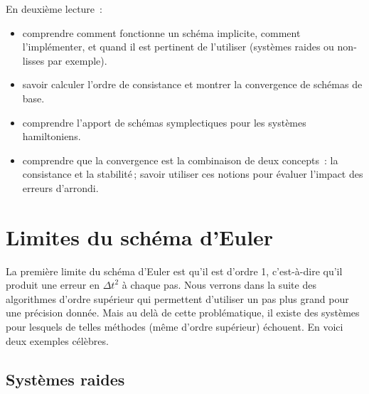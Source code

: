 En deuxième lecture~:

\begin{itemize}
\item
  comprendre comment fonctionne un schéma implicite, comment
  l'implémenter, et quand il est pertinent de l'utiliser (syst\`emes raides ou non-lisses par exemple).
\item
savoir calculer l'ordre de consistance et montrer la convergence de
schémas de base.
\item
comprendre l'apport de schémas symplectiques pour les systèmes
hamiltoniens.
\item
  comprendre que la convergence est la combinaison de deux concepts~: la
  consistance et la stabilité\,; savoir utiliser ces notions pour
  évaluer l'impact des erreurs d'arrondi.
\end{itemize}

\hypertarget{ed2-limites-du-schuxe9ma-deuler}{%
\chapter{Limites du schéma d'Euler}\label{ed2-limites-du-schuxe9ma-deuler}}

La première limite du schéma d'Euler est qu'il est d'ordre 1,
c'est-à-dire qu'il produit une erreur en \({\Delta t}^2\) à chaque pas.
Nous verrons dans la suite des algorithmes d'ordre supérieur qui
permettent d'utiliser un pas plus grand pour une précision donnée. Mais
au delà de cette problématique, il existe des systèmes pour lesquels de
telles méthodes (même d'ordre supérieur) échouent. En voici deux
exemples célèbres.

\hypertarget{ed2-sec_systRaides}{%
\section{Systèmes raides}\label{ed2-sec_systRaides}}

